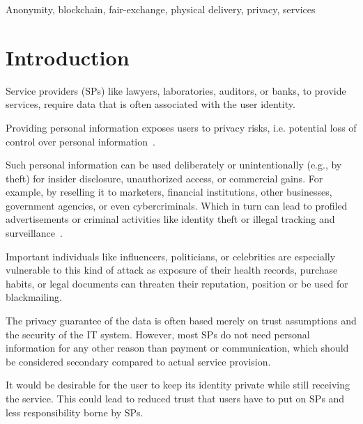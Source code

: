 \documentclass{ieeeaccess}
\begin{document}
\begin{keywords}
Anonymity, blockchain, fair-exchange, physical delivery, privacy, services
\end{keywords}

\titlepgskip=-15pt

\maketitle
\section{Introduction}
Service providers (SPs) like lawyers, laboratories, auditors, or banks,
to provide services, require data that is often associated with the user
identity.

Providing personal information exposes users to privacy risks, i.e. potential loss of control over personal information~\cite{smithInformationPrivacyResearch2011}.

Such personal information can be used deliberately or unintentionally
(e.g., by theft) for insider disclosure, unauthorized access, or commercial gains. For example, by reselling it to marketers, financial institutions, other businesses, government agencies, or even cybercriminals. Which in turn can lead to profiled advertisements or criminal activities like identity theft or illegal tracking and surveillance~\cite{smithInformationPrivacyResearch2011}.

Important individuals like influencers, politicians, or celebrities are especially vulnerable to this kind of attack as exposure of their health records, purchase habits, or legal documents can threaten their reputation, position or be used for blackmailing.

The privacy guarantee of the data is often based merely on trust assumptions and the security of the IT system. However, most SPs do not need personal information for any other reason than payment or communication, which should be considered secondary compared to actual service provision.

It would be desirable for the user to keep its identity private while still receiving the service. This could lead to reduced trust that users have to put on SPs and less responsibility borne by SPs.
\end{document}
